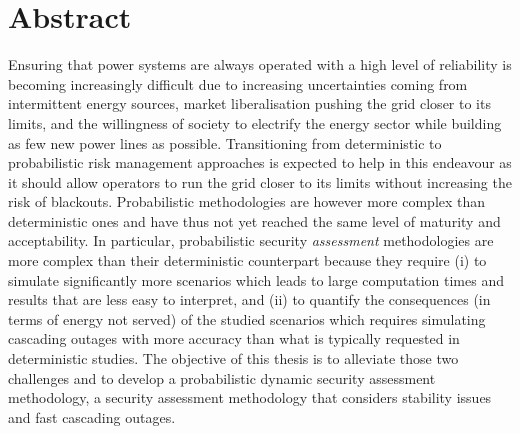 \chapter*{Abstract}

Ensuring that power systems are always operated with a high level of reliability is becoming increasingly difficult due to increasing uncertainties coming from intermittent energy sources, market liberalisation pushing the grid closer to its limits, and the willingness of society to electrify the energy sector while building as few new power lines as possible. Transitioning from deterministic to probabilistic risk management approaches is expected to help in this endeavour as it should allow operators to run the grid closer to its limits without increasing the risk of blackouts. Probabilistic methodologies are however more complex than deterministic ones and have thus not yet reached the same level of maturity and acceptability. In particular, probabilistic security \emph{assessment} methodologies are more complex than their deterministic counterpart because they require (i) to simulate significantly more scenarios which leads to large computation times and results that are less easy to interpret, and (ii) to quantify the consequences (\eg in terms of energy not served) of the studied scenarios which requires simulating cascading outages with more accuracy than what is typically requested in deterministic studies. The objective of this thesis is to alleviate those two challenges and to develop a probabilistic dynamic security assessment methodology, \ie a security assessment methodology that considers stability issues and fast cascading outages.

